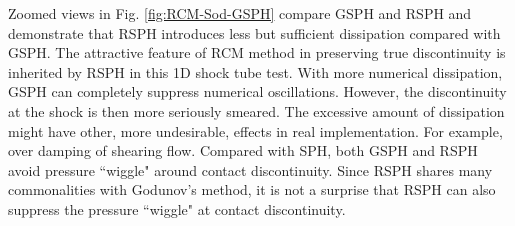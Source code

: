 \documentclass[review]{elsarticle}
\begin{document}
Zoomed views in Fig. \ref{fig:RCM-Sod-GSPH} compare GSPH and RSPH and demonstrate that RSPH introduces less but sufficient dissipation compared with GSPH. The attractive feature of RCM method in preserving true discontinuity is inherited by RSPH in this 1D shock tube test. With more numerical dissipation, GSPH can completely suppress numerical oscillations. However, the discontinuity at the shock is then more seriously smeared. The excessive amount of dissipation might have other, more undesirable, effects in real implementation. For example, over damping of shearing flow. Compared with SPH, both GSPH and RSPH avoid pressure ``wiggle" around contact discontinuity. Since RSPH shares many commonalities   with Godunov's method, it is not a surprise that RSPH can also suppress the pressure ``wiggle" at contact discontinuity.
\end{document}
